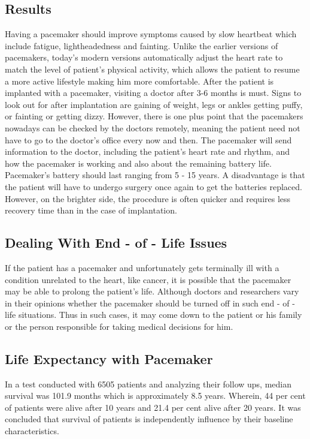 \documentclass[12pt]{article}
\begin{document}
\begin{normalsize}
\subsection{Results}
Having a pacemaker should improve symptoms caused by slow heartbeat which include fatigue, lightheadedness and fainting. Unlike the earlier versions of pacemakers, today's modern versions automatically adjust the heart rate to match the level of patient's physical activity, which allows the patient to resume a more active lifestyle making him more comfortable.
\linebreak
\linebreak
After the patient is implanted with a pacemaker, visiting a doctor after 3-6 months is must. Signs to look out for after implantation are gaining of weight, legs or ankles getting puffy, or fainting or getting dizzy.
\linebreak
\linebreak
However, there is one plus point that the pacemakers nowadays can be checked by the doctors remotely, meaning the patient need not have to go to the doctor's office every now and then. The pacemaker will send information to the doctor, including the patient's heart rate and rhythm, and how the pacemaker is working  and also about the remaining battery life.
\linebreak
\linebreak
Pacemaker's battery should last ranging from 5 - 15 years. A disadvantage is that the patient will have to undergo surgery once again to get the batteries replaced. However, on the brighter side, the procedure is often quicker and requires less recovery time than in the case of implantation.

\subsection{Dealing With End - of - Life Issues}
If the patient has a pacemaker and unfortunately gets terminally ill with a condition unrelated to the heart, like cancer, it is possible that the pacemaker may be able to prolong the patient's life. Although doctors and researchers vary in their opinions whether the pacemaker should be turned off in such end - of - life situations.
\linebreak
Thus in such cases, it may come down to the patient or his family or the person responsible for taking medical decisions for him. 

\subsection{Life Expectancy with Pacemaker}
In a test conducted with 6505 patients and analyzing their follow ups, median survival was 101.9 months which is approximately 8.5 years. Wherein, 44 per cent of patients were alive after 10 years and 21.4 per cent alive after 20 years. It was concluded that survival of patients is independently influence by their baseline characteristics.


\end{normalsize}
\end{document}
